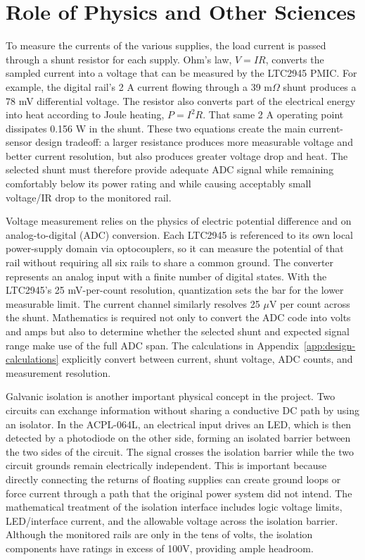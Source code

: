 \chapter{Role of Physics and Other Sciences}
\label{chap:physics-science}

To measure the currents of the various supplies, the load current is passed through a shunt resistor for each supply. Ohm's law, \(V=IR\), converts the sampled current into a voltage that can be measured by the LTC2945 PMIC. For example, the digital rail's 2 A current flowing
through a 39 m\(\Omega\) shunt produces a 78 mV differential voltage. The
resistor also converts part of the electrical energy into heat according to
Joule heating, \(P=I^2R\). That same 2 A operating point dissipates 0.156 W in
the shunt. These two equations create the main current-sensor design tradeoff:
a larger resistance produces more measurable voltage and better current
resolution, but also produces greater voltage drop and heat. The selected shunt
must therefore provide adequate ADC signal while remaining comfortably below its
power rating and while causing acceptably small voltage/IR drop to the monitored
rail.

Voltage measurement relies on the physics of electric potential difference and
on analog-to-digital (ADC) conversion. Each LTC2945 is referenced to its own local
power-supply domain via optocouplers, so it can measure the potential of that rail without
requiring all six rails to share a common ground. The converter represents an
analog input with a finite number of digital states. With the LTC2945's 25
mV-per-count resolution, quantization sets the bar for the lower measurable limit. The current channel similarly resolves 25 \(\mu\)V per count across the shunt. Mathematics is required not only to convert the ADC code into volts and amps but also to determine whether the selected shunt and expected signal range make use of the full
ADC span. The calculations in Appendix~\ref{app:design-calculations} explicitly
convert between current, shunt voltage, ADC counts, and measurement resolution.

Galvanic isolation is another important physical concept in the project. Two
circuits can exchange information without sharing a conductive DC path by using
an isolator. In the ACPL-064L, an electrical input drives an LED, which is then detected by a photodiode on the other side, forming an isolated barrier between the two sides of the circuit. The signal crosses the isolation barrier while the two circuit grounds remain
electrically independent. This is important because directly connecting the
returns of floating supplies can create ground loops or force current through a
path that the original power system did not intend. The mathematical treatment
of the isolation interface includes logic voltage limits, LED/interface current,
and the allowable voltage across the isolation barrier. Although the monitored
rails are only in the tens of volts, the isolation components have ratings in excess of 100V, providing ample headroom.

